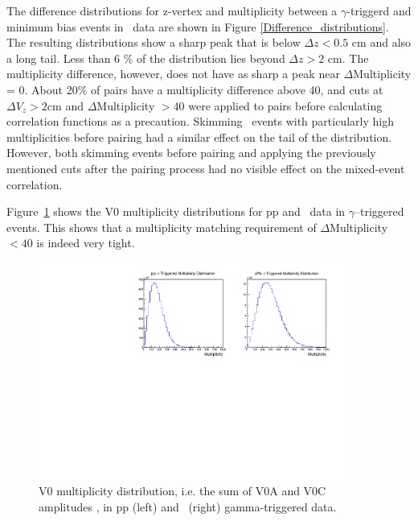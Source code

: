 The difference distributions for z-vertex and multiplicity between a \(\gamma\)-triggerd and minimum bias events in \pPb~data are shown in Figure \ref{Difference_distributions}. The resulting distributions show a sharp peak that is below {$\Delta z<0.5$ cm} and also a long tail. Less than 6 \% of the distribution lies beyond $\Delta z > 2$ cm. The multiplicity difference, however, does not have as sharp a peak near \(\Delta\)Multiplicity = 0. About 20$\%$ of pairs have a multiplicity difference above 40, and cuts at \(\Delta V_z > 2\)cm and \(\Delta\)Multiplicity \(> 40\) were applied to pairs before calculating correlation functions as a precaution.
Skimming \pPb~events with particularly high multiplicities before pairing had a similar effect on the tail of the distribution. However, both skimming events before pairing and applying the previously mentioned cuts after the pairing process had no visible effect on the mixed-event correlation.


Figure~\ref{fig:Multiplicitydistributions} shows the V0 multiplicity distributions for pp and \pPb~data in $\gamma$--triggered events. This shows that a multiplicity matching requirement of \(\Delta\)Multiplicity \(< 40\) is indeed very tight.

\begin{figure}[h]
  \center
  \includegraphics[width=0.9\textwidth]{Data_Analysis/EventMixing/Abs_Multplicity_Dist.pdf}
  \caption{V0 multiplicity distribution, i.e. the sum of V0A and V0C amplitudes , in pp (left) and \pPb~(right) gamma-triggered data.}
  \label{fig:Multiplicitydistributions}
\end{figure}

